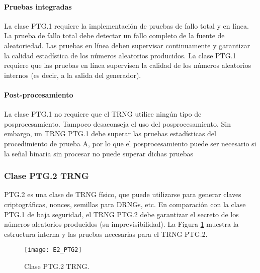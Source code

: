                 \paragraph{Pruebas integradas\\}
                
                La clase PTG.1 requiere la implementación de pruebas de fallo total y en línea. La prueba de fallo total debe detectar un fallo completo de la fuente de aleatoriedad. Las pruebas en línea deben supervisar continuamente y garantizar la calidad estadística de los números aleatorios producidos. La clase PTG.1 requiere que las pruebas en línea supervisen la calidad de los números aleatorios internos (es decir, a la salida del generador).
                
                \paragraph{Post-procesamiento\\}
                
                La clase PTG.1 no requiere que el TRNG utilice ningún tipo de posprocesamiento. Tampoco desaconseja el uso del posprocesamiento. Sin embargo, un TRNG PTG.1 debe superar las pruebas estadísticas del procedimiento de prueba A, por lo que el posprocesamiento puede ser necesario si la señal binaria sin procesar no puede superar dichas pruebas

            \subsubsection{Clase PTG.2 TRNG}
            
                PTG.2 es una clase de TRNG físico, que puede utilizarse para generar claves criptográficas, nonces, semillas para DRNGs, etc. En comparación con la clase PTG.1 de baja seguridad, el TRNG PTG.2 debe garantizar el secreto de los números aleatorios producidos (su imprevisibilidad). La Figura \ref{fig:E2_PTG2} muestra la estructura interna y las pruebas necesarias para el TRNG PTG.2.

                \begin{figure}[hbtp]
                    \caption{Clase PTG.2 TRNG.}
                    \centering
                    \texttt{[image: E2\_PTG2]}
                    \label{fig:E2_PTG2}
                \end{figure}
            
